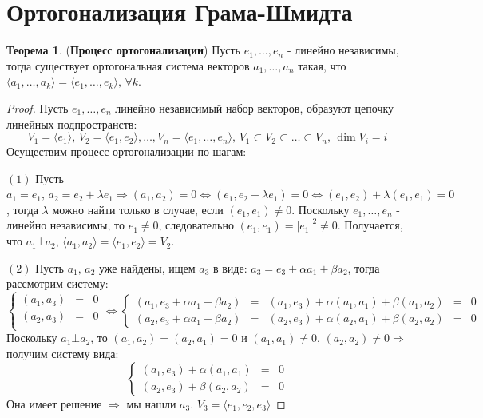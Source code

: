 \documentclass[12pt]{article}
\theoremstyle{definition}
\newtheorem{theorem}{Теорема}
\begin{document}
\section*{Ортогонализация Грама-Шмидта}


\begin{theorem}(\textbf{Процесс ортогонализации})
	Пусть $e_1, \dotsc, e_n$ - линейно независимы, тогда существует ортогональная система векторов $a_1,\dotsc, a_n$ такая, что $\langle a_1, \dotsc, a_k \rangle = \langle e_1, \dotsc, e_k \rangle, \, \forall k$.
\end{theorem}
\begin{proof}
	Пусть $e_1,\dotsc, e_n$ линейно независимый набор векторов, образуют цепочку линейных подпространств:
	$$
		V_1 = \langle e_1\rangle, \, V_2 = \langle e_1, e_2\rangle, \dotsc , V_n = \langle e_1, \dotsc, e_n\rangle, \,  V_1 \subset V_2 \subset \dotsc \subset V_n, \, \dim{V_i} = i
	$$
	Осуществим процесс ортогонализации по шагам:
	
	$(1)$ Пусть $a_1 = e_1, \, a_2 = e_2 + \lambda e_1 \Rightarrow (a_1, a_2) = 0 \Leftrightarrow (e_1, e_2 + \lambda e_1) = 0 \Leftrightarrow (e_1, e_2) + \lambda(e_1,e_1) = 0$, тогда $\lambda$ можно найти только в случае, если $(e_1,e_1) \neq 0$. Поскольку $e_1, \dotsc, e_n$ - линейно независимы, то $e_1 \neq 0$, следовательно $(e_1, e_1) = |e_1|^2 \neq 0$. Получается, что $a_1 \bot a_2$, $\langle a_1, a_2\rangle = \langle e_1, e_2\rangle = V_2$.
	
	$(2)$ Пусть $a_1, \, a_2$ уже найдены, ищем $a_3$ в виде: $a_3 = e_3 + \alpha a_1 + \beta a_2$, тогда рассмотрим систему:
	$$
		\left\{\begin{array}{ccc}
			(a_1,a_3) & = & 0\\
			(a_2,a_3) & = & 0\\
		\end{array}\right. \Leftrightarrow 
		\left\{\begin{array}{ccccc}
			(a_1,e_3 + \alpha a_1 + \beta a_2) & = & (a_1, e_3) + \alpha(a_1,a_1) + \beta(a_1,a_2) & = & 0\\
			(a_2,e_3 + \alpha a_1 + \beta a_2) & = & (a_2, e_3) + \alpha(a_2,a_1) + \beta(a_2,a_2) & = & 0
		\end{array}\right.
	$$
	Поскольку $a_1 \bot a_2$, то $(a_1, a_2) = (a_2,a_1) = 0$ и $(a_1,a_1) \neq 0 ,\, (a_2,a_2) \neq 0 \Rightarrow$ получим систему вида:
	$$
		\left\{\begin{array}{ccc}
			(a_1, e_3) + \alpha(a_1,a_1)  & = & 0\\
			(a_2, e_3) + \beta(a_2,a_2) & = & 0
		\end{array}\right.
	$$
	Она имеет решение $\Rightarrow$ мы нашли $a_3$. $V_3 = \langle e_1, e_2, e_3\rangle$
	

\end{proof}
\end{document}

